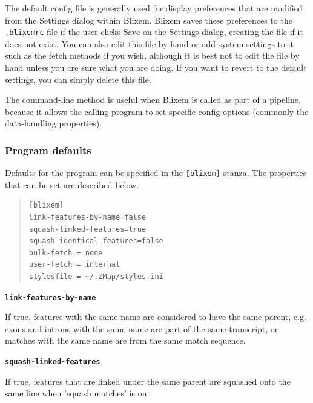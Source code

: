\documentclass[letterpaper]{article}
\newcommand\textstyleSourceText[1]{\texttt{#1}}
\begin{document}
{The default config file is generally used for display preferences that are
  modified from the Settings dialog within Blixem. Blixem saves these
  preferences to the \texttt{.blixemrc} file if the user clicks Save on the Settings
  dialog, creating the file if it does not exist. You can also edit this file by
  hand or add system settings to it such as the fetch methods if you wish,
  although it is best not to edit the file by hand unless you are sure what you
  are doing. If you want to revert to the default settings, you can simply
  delete this file.}

\bigskip

{The command-line method is useful when Blixem is called as part of a
pipeline, because it allows the calling program to set specific config
options (commonly the data-handling properties). }

{\color[rgb]{0.30980393,0.5058824,0.7411765}\subsubsection[Program defaults]{Program defaults}}
\hypertarget{RefHeading37691724351149}{}{
Defaults for the program can be specified in the
\textstyleSourceText{\texttt{[blixem]}} stanza. The properties that can
be set are described below. }

\bigskip

\begin{quote}
\begin{verbatim}
[blixem]
link-features-by-name=false
squash-linked-features=true
squash-identical-features=false
bulk-fetch = none
user-fetch = internal
stylesfile = ~/.ZMap/styles.ini
\end{verbatim}
\end{quote}

{\textstyleSourceText{\textrm{\textbf{link-features-by-name}}}\textbf{ }}

{If true, features with the same name are considered to have the same
parent, e.g. exons and introns with the same name are part of the same
transcript, or matches with the same name are from the same match
sequence. }

\bigskip

{\textstyleSourceText{\textrm{\textbf{squash-linked-features}}}\textbf{ }}

{If true, features that are linked under the same parent are squashed onto the same line when 'squash matches' is on.}

\bigskip
\end{document}
